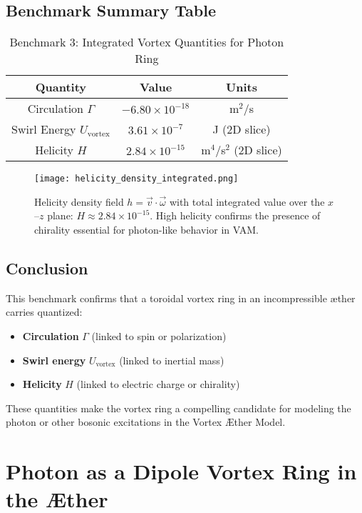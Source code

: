 \subsection{Benchmark Summary Table}

\begin{table}[H]
\centering
\caption{Benchmark 3: Integrated Vortex Quantities for Photon Ring}
\begin{tabular}{|c|c|c|}
\hline
\textbf{Quantity} & \textbf{Value} & \textbf{Units} \\
\hline
Circulation $\Gamma$ & $-6.80 \times 10^{-18}$ & m$^2$/s \\
Swirl Energy $U_{\text{vortex}}$ & $3.61 \times 10^{-7}$ & J (2D slice) \\
Helicity $H$ & $2.84 \times 10^{-15}$ & m$^4$/s$^2$ (2D slice) \\
\hline
\end{tabular}
\end{table}

\begin{figure}[H]
    \centering
    \texttt{[image: helicity\_density\_integrated.png]}
    \caption{Helicity density field $h = \vec{v} \cdot \vec{\omega}$ with total integrated value over the $x$–$z$ plane: $H \approx 2.84 \times 10^{-15}$. High helicity confirms the presence of chirality essential for photon-like behavior in VAM.}
\end{figure}

\subsection{Conclusion}

This benchmark confirms that a toroidal vortex ring in an incompressible æther carries quantized:

\begin{itemize}
    \item \textbf{Circulation} $\Gamma$ (linked to spin or polarization)
    \item \textbf{Swirl energy} $U_{\text{vortex}}$ (linked to inertial mass)
    \item \textbf{Helicity} $H$ (linked to electric charge or chirality)
\end{itemize}

These quantities make the vortex ring a compelling candidate for modeling the photon or other bosonic excitations in the Vortex Æther Model.


\section{Photon as a Dipole Vortex Ring in the Æther}

